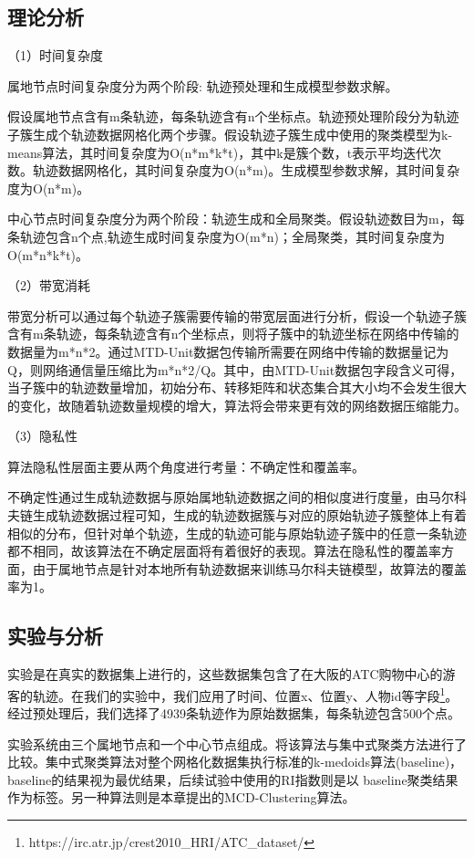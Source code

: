 \subsection{理论分析}

（1）时间复杂度

属地节点时间复杂度分为两个阶段: 轨迹预处理和生成模型参数求解。

假设属地节点含有m条轨迹，每条轨迹含有n个坐标点。轨迹预处理阶段分为轨迹子簇生成个轨迹数据网格化两个步骤。假设轨迹子簇生成中使用的聚类模型为k-means算法，其时间复杂度为O(n*m*k*t)，其中k是簇个数，t表示平均迭代次数。轨迹数据网格化，其时间复杂度为O(n*m)。生成模型参数求解，其时间复杂度为O(n*m)。

中心节点时间复杂度分为两个阶段：轨迹生成和全局聚类。假设轨迹数目为m，每条轨迹包含n个点,轨迹生成时间复杂度为O(m*n)；全局聚类，其时间复杂度为O(m*n*k*t)。

（2）带宽消耗

带宽分析可以通过每个轨迹子簇需要传输的带宽层面进行分析，假设一个轨迹子簇含有m条轨迹，每条轨迹含有n个坐标点，则将子簇中的轨迹坐标在网络中传输的数据量为m*n*2。通过MTD-Unit数据包传输所需要在网络中传输的数据量记为Q，则网络通信量压缩比为m*n*2/Q。其中，由MTD-Unit数据包字段含义可得，当子簇中的轨迹数量增加，初始分布、转移矩阵和状态集合其大小均不会发生很大的变化，故随着轨迹数量规模的增大，算法将会带来更有效的网络数据压缩能力。

（3）隐私性

算法隐私性层面主要从两个角度进行考量：不确定性和覆盖率。

不确定性通过生成轨迹数据与原始属地轨迹数据之间的相似度进行度量，由马尔科夫链生成轨迹数据过程可知，生成的轨迹数据簇与对应的原始轨迹子簇整体上有着相似的分布，但针对单个轨迹，生成的轨迹可能与原始轨迹子簇中的任意一条轨迹都不相同，故该算法在不确定层面将有着很好的表现。算法在隐私性的覆盖率方面，由于属地节点是针对本地所有轨迹数据来训练马尔科夫链模型，故算法的覆盖率为1。

\subsection{实验与分析}

实验是在真实的数据集上进行的，这些数据集包含了在大阪的ATC购物中心的游客的轨迹。在我们的实验中，我们应用了时间、位置x、位置y、人物id等字段\footnote[1]{https://irc.atr.jp/crest2010_HRI/ATC_dataset/}。经过预处理后，我们选择了4939条轨迹作为原始数据集，每条轨迹包含500个点。

实验系统由三个属地节点和一个中心节点组成。将该算法与集中式聚类方法进行了比较。集中式聚类算法对整个网格化数据集执行标准的k-medoids算法(baseline)， baseline的结果视为最优结果，后续试验中使用的RI指数则是以 baseline聚类结果作为标签。另一种算法则是本章提出的MCD-Clustering算法。

